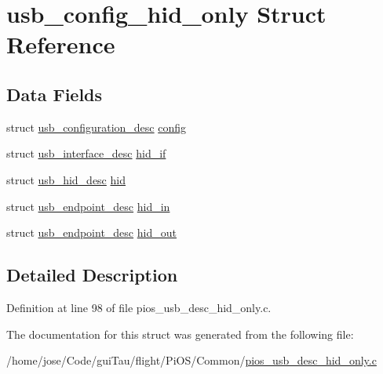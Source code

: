 \hypertarget{structusb__config__hid__only}{\section{usb\-\_\-config\-\_\-hid\-\_\-only Struct Reference}
\label{structusb__config__hid__only}
}
\subsection*{Data Fields}
\begin{DoxyCompactItemize}
\item 
struct \hyperlink{structusb__configuration__desc}{usb\-\_\-configuration\-\_\-desc} \hyperlink{group___p_i_o_s___u_s_b___d_e_s_c_gae5e25501e424468c229df0d1e09423a8}{config}
\item 
struct \hyperlink{structusb__interface__desc}{usb\-\_\-interface\-\_\-desc} \hyperlink{group___p_i_o_s___u_s_b___d_e_s_c_gab8d4a603dbaaacc357e4beb426cfd094}{hid\-\_\-if}
\item 
struct \hyperlink{structusb__hid__desc}{usb\-\_\-hid\-\_\-desc} \hyperlink{group___p_i_o_s___u_s_b___d_e_s_c_ga279cdc579474d229bf1bb7963f423423}{hid}
\item 
struct \hyperlink{structusb__endpoint__desc}{usb\-\_\-endpoint\-\_\-desc} \hyperlink{group___p_i_o_s___u_s_b___d_e_s_c_gac0401b402235f315c995eb13de1425ec}{hid\-\_\-in}
\item 
struct \hyperlink{structusb__endpoint__desc}{usb\-\_\-endpoint\-\_\-desc} \hyperlink{group___p_i_o_s___u_s_b___d_e_s_c_ga0bdaf8c80f7739bea621a6d5aa272641}{hid\-\_\-out}
\end{DoxyCompactItemize}


\subsection{Detailed Description}


Definition at line 98 of file pios\-\_\-usb\-\_\-desc\-\_\-hid\-\_\-only.\-c.



The documentation for this struct was generated from the following file\-:\begin{DoxyCompactItemize}
\item 
/home/jose/\-Code/gui\-Tau/flight/\-Pi\-O\-S/\-Common/\hyperlink{pios__usb__desc__hid__only_8c}{pios\-\_\-usb\-\_\-desc\-\_\-hid\-\_\-only.\-c}\end{DoxyCompactItemize}
